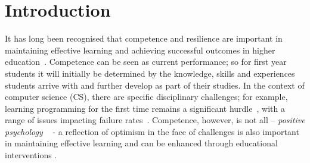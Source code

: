 \documentclass[sigconf]{acmart}
\begin{document}
%
\maketitle

\section{Introduction}
It has long been recognised that competence and resilience are important in maintaining effective learning and achieving successful outcomes in higher education~\cite{Marsten95,Walker2006,Holdsworth2018}. Competence can be seen as current performance; so for first year students it will initially be determined by the knowledge, skills and experiences students arrive with and further develop as part of their studies. In the context of computer science (CS), there are specific disciplinary challenges; for example, learning programming for the first time remains a significant hurdle~\cite{davenport-et-al:latice2016,murphy-et-al:programming2017,simon-et-al:sigcse2018}, with a range of issues impacting failure rates~\cite{Watson:2014:FRI:2591708.2591749}. Competence, however, is not all -- \textit{positive psychology ~\cite{Seligman90}} - a reflection of optimism in the face of challenges is also important in maintaining effective learning and can be enhanced through educational interventions \cite{Walker2006,Holdsworth2018}.

\end{document}
